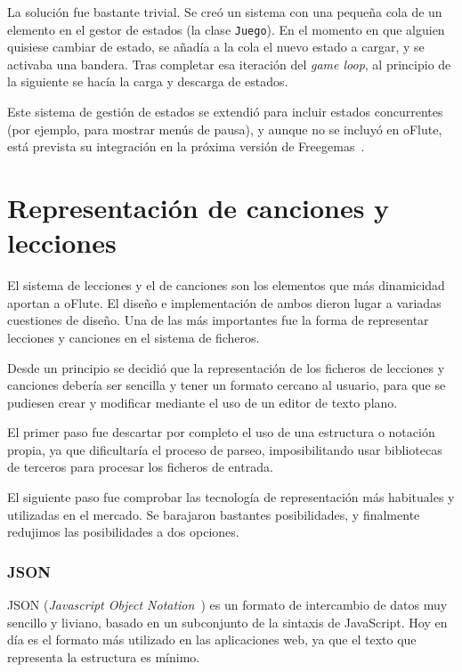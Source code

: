 \label{sec:resolucion_problema_estados}

La solución fue bastante trivial. Se creó un sistema con una pequeña cola de un
elemento en el gestor de estados (la clase \texttt{Juego}). En el momento en que
alguien quisiese cambiar de estado, se añadía a la cola el nuevo estado a
cargar, y se activaba una bandera. Tras completar esa iteración del \textit{game
  loop}, al principio de la siguiente se hacía la carga y descarga de estados.

Este sistema de gestión de estados se extendió para incluir estados concurrentes
(por ejemplo, para mostrar menús de pausa), y aunque no se incluyó en oFlute,
está prevista su integración en la próxima versión de Freegemas~\cite{freegemas}.

\section{Representación de canciones y lecciones}
El sistema de lecciones y el de canciones son los elementos que más dinamicidad
aportan a oFlute. El diseño e implementación de ambos dieron lugar a variadas
cuestiones de diseño. Una de las más importantes fue la forma de representar
lecciones y canciones en el sistema de ficheros.

Desde un principio se decidió que la representación de los ficheros de lecciones
y canciones debería ser sencilla y tener un formato cercano al usuario, para que
se pudiesen crear y modificar mediante el uso de un editor de texto plano.

El primer paso fue descartar por completo el uso de una estructura o notación
propia, ya que dificultaría el proceso de parseo, imposibilitando usar
bibliotecas de terceros para procesar los ficheros de entrada.

El siguiente paso fue comprobar las tecnología de representación más habituales
y utilizadas en el mercado. Se barajaron bastantes posibilidades, y finalmente
redujimos las posibilidades a dos opciones.

\subsubsection{JSON}
JSON (\textit{Javascript Object Notation}~\cite{JSON}) es un formato de
intercambio de datos muy sencillo y liviano, basado en un subconjunto de la
sintaxis de JavaScript. Hoy en día es el formato más utilizado en las
aplicaciones web, ya que el texto que representa la estructura es mínimo.

